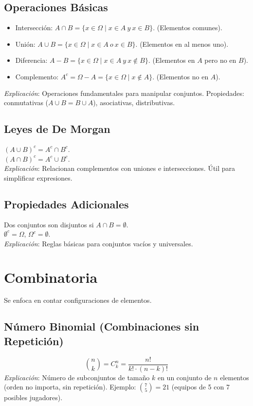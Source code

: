 \documentclass{article}
\begin{document}
\subsection{Operaciones Básicas}
\begin{itemize}
    \item Intersección: \( A \cap B = \{ x \in \Omega \mid x \in A \ y \ x \in B \} \). (Elementos comunes).
    \item Unión: \( A \cup B = \{ x \in \Omega \mid x \in A \ o \ x \in B \} \). (Elementos en al menos uno).
    \item Diferencia: \( A - B = \{ x \in \Omega \mid x \in A \ y \ x \notin B \} \). (Elementos en \( A \) pero no en \( B \)).
    \item Complemento: \( A^c = \Omega - A = \{ x \in \Omega \mid x \notin A \} \). (Elementos no en \( A \)).
\end{itemize}
\textit{Explicación}: Operaciones fundamentales para manipular conjuntos. Propiedades: conmutativas (\( A \cup B = B \cup A \)), asociativas, distributivas.

\subsection{Leyes de De Morgan}
\( {(A \cup B)}^c = A^c \cap B^c \). \\
\( {(A \cap B)}^c = A^c \cup B^c \). \\
\textit{Explicación}: Relacionan complementos con uniones e intersecciones. Útil para simplificar expresiones.

\subsection{Propiedades Adicionales}
Dos conjuntos son disjuntos si \( A \cap B = \emptyset \). \\
\( \emptyset^c = \Omega \), \( \Omega^c = \emptyset \). \\
\textit{Explicación}: Reglas básicas para conjuntos vacíos y universales.

\section{Combinatoria}
Se enfoca en contar configuraciones de elementos.

\subsection{Número Binomial (Combinaciones sin Repetición)}
\[
\binom{n}{k} = C_k^n = \frac{n!}{k! \cdot (n-k)!}
\]
\textit{Explicación}: Número de subconjuntos de tamaño \( k \) en un conjunto de \( n \) elementos (orden no importa, sin repetición). Ejemplo: \( \binom{7}{5} = 21 \) (equipos de 5 con 7 posibles jugadores).
\end{document}
